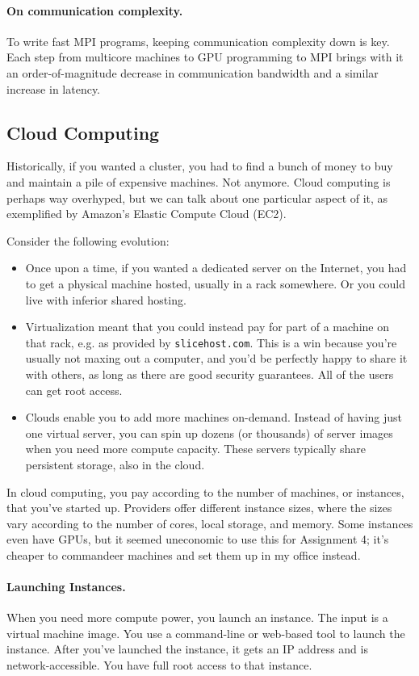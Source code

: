 \documentclass[11pt]{article}
\begin{document}
\paragraph{On communication complexity.} To write fast MPI programs,
keeping communication complexity down is key. Each step from multicore
machines to GPU programming to MPI brings with it an
order-of-magnitude decrease in communication bandwidth and a similar
increase in latency.

\subsection*{Cloud Computing}
Historically, if you wanted a cluster, you had to find a bunch of
money to buy and maintain a pile of expensive machines. Not anymore.
Cloud computing is perhaps way overhyped, but we can talk about 
one particular aspect of it, as exemplified by Amazon's Elastic
Compute Cloud (EC2).

Consider the following evolution:
\begin{itemize}
\item Once upon a time, if you wanted a dedicated server on the
  Internet, you had to get a physical machine hosted, usually in a
  rack somewhere. Or you could live with inferior shared hosting.
\item Virtualization meant that you could instead pay for part of a
  machine on that rack, e.g. as provided by {\tt slicehost.com}.  This
  is a win because you're usually not maxing out a computer, and you'd
  be perfectly happy to share it with others, as long as there are
  good security guarantees. All of the users can get root access.
\item Clouds enable you to add more machines on-demand. Instead of
  having just one virtual server, you can spin up dozens (or
  thousands) of server images when you need more compute
  capacity. These servers typically share persistent storage, also in
  the cloud. 
\end{itemize}

In cloud computing, you pay according to the number of machines, or
instances, that you've started up. Providers offer different instance
sizes, where the sizes vary according to the number of cores, local
storage, and memory. Some instances even have GPUs, but it seemed 
uneconomic to use this for Assignment 4; it's cheaper to commandeer
machines and set them up in my office instead.

\paragraph{Launching Instances.} When you need more compute power,
you launch an instance. The input is a virtual machine image.  You use
a command-line or web-based tool to launch the instance.  After you've
launched the instance, it gets an IP address and is
network-accessible. You have full root access to that instance.
\end{document}
